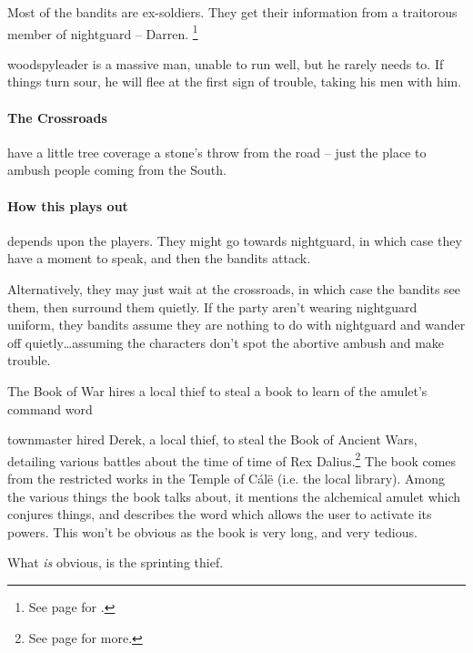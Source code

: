 \begin{multicols}{2}
Most of the bandits are ex-soldiers.
They get their information from a traitorous member of \gls{nightguard} -- Darren.%
\footnote{See page \pageref{traitor} for .}


\woodspyleader

\Gls{woodspyleader} is a massive man, unable to run well, but he rarely needs to.
If things turn sour, he will flee at the first sign of trouble, taking his men with him.

\paragraph{The Crossroads} have a little tree coverage a stone's throw from the road -- just the place to ambush people coming from the South.

\paragraph{How this plays out} depends upon the players.
They might go towards \gls{nightguard}, in which case they have a moment to speak, and then the bandits attack.

Alternatively, they may just wait at the crossroads, in which case the bandits see them, then surround them quietly.
If the party aren't wearing \gls{nightguard} uniform, they bandits assume they are nothing to do with \gls{nightguard} and wander off quietly\ldots assuming the characters don't spot the abortive ambush and make trouble.

{The Book of War}%
{ hires a local thief to steal a book to learn of the amulet's command word}%

\Gls{townmaster} hired Derek, a local thief, to steal the Book of Ancient Wars, detailing various battles about the time of time of Rex Dalius.\footnote{See page \pageref{h_dalius} for more.}
The book comes from the restricted works in the Temple of C\'{a}l\"{e} (i.e. the local library).
Among the various things the book talks about, it mentions the alchemical amulet which conjures things, and describes the word which allows the user to activate its powers.
This won't be obvious as the book is very long, and very tedious.

What \emph{is} obvious, is the sprinting thief.

\begin{boxtext}


\end{boxtext}
\end{multicols}
